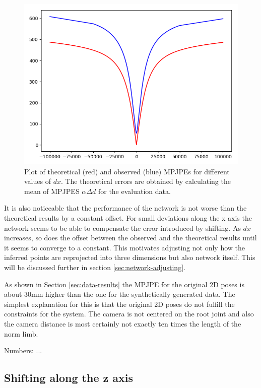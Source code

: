 \begin{figure}[ht]	
	\centering
	\includegraphics[scale=0.5]{figures/x_shift_error.png}
	\caption{Plot of theoretical (red) and observed (blue) MPJPEs for different values of $dx$. 
		The theoretical errors are obtained by calculating the mean of MPJPES $\alpha \Delta d$ for the evaluation data.}
	\label{fig:x-shift-error}
\end{figure}

It is also noticeable that the performance of the network is not worse than the theoretical results by a constant offset.
For small deviations along the x axis the network seems to be able to compensate the error introduced by shifting.
As $dx$ increases, so does the offset between the observed and the theoretical results until it seems to converge to a constant.
This motivates adjusting not only how the inferred points are reprojected into three dimensions but also network itself.
This will be discussed further in section \ref{sec:network-adjusting}.

As shown in Section \ref{sec:data-results} the MPJPE for the original 2D poses is about  30mm higher than the one for the synthetically generated data.
The simplest explanation for this is that the original 2D poses do not fulfill the constraints for the system.
The camera is not centered on the root joint and also the camera distance is most certainly not exactly ten times the length of the norm limb.

Numbers: ...
	
\subsection{Shifting along the z axis}
\label{sec:z-shift-error}

